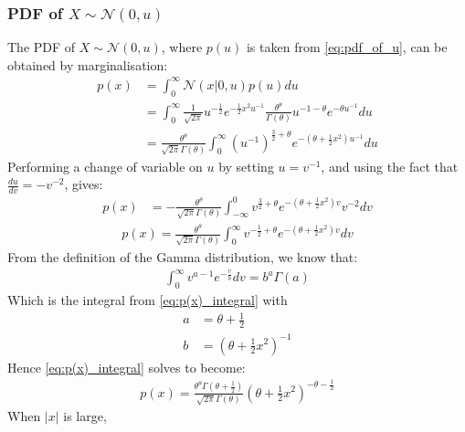 \documentclass[a4paper]{article}
\begin{document}
\subsubsection{PDF of $X \sim \mathcal{N}(0, u)$}
The PDF of $X \sim \mathcal{N}(0, u)$, where $p(u)$ is taken from \autoref{eq:pdf_of_u}, can be obtained by
marginalisation:
\begin{align*}
    p(x) &= \int_0^\infty \mathcal{N}(x | 0, u) p(u) du \\
    &= \int_0^\infty \frac{1}{\sqrt{2\pi}} u^{-\frac{1}{2}} e^{-\frac{1}{2} x^2 u^{-1}}
    \frac{\theta^{\theta}}{\Gamma(\theta)} u^{-1-\theta} e^{-\theta u^{-1}} du \\
    &= \frac{\theta^{\theta}}{\sqrt{2\pi} \Gamma(\theta)}
    \int_0^\infty \left( u^{-1} \right) ^ {\frac{3}{2} + \theta} e^{-\left( \theta + \frac{1}{2} x^2 \right) u^{-1}} du
\end{align*}
Performing a change of variable on $u$ by setting $u = v^{-1}$, and using the fact that $\frac{du}{dv} = -v^{-2}$,
gives:
\begin{align*}
    p(x) &= - \frac{\theta^{\theta}}{\sqrt{2\pi} \Gamma(\theta)}
    \int_{-\infty}^0 v ^ {\frac{3}{2} + \theta} e^{-\left( \theta + \frac{1}{2} x^2 \right) v} v^{-2} dv
\end{align*}
\begin{align}\label{eq:p(x)_integral}
    p(x) = \frac{\theta^{\theta}}{\sqrt{2\pi} \Gamma(\theta)}
    \int_0^\infty v ^ {-\frac{1}{2} + \theta} e^{-\left( \theta + \frac{1}{2} x^2 \right) v} dv
\end{align}
From the definition of the Gamma distribution, we know that:
\begin{align*}
    \int_0^\infty v ^ {a - 1} e^{-\frac{v}{b}} dv = b^a \Gamma(a)
\end{align*}
Which is the integral from \autoref{eq:p(x)_integral} with
\begin{align*}
    a &= \theta + \frac{1}{2} \\
    b &= \left(\theta + \frac{1}{2} x^2 \right) ^ {-1}
\end{align*}
Hence \autoref{eq:p(x)_integral} solves to become:
\begin{align}
    p(x) = \frac{\theta^{\theta} \Gamma\left(\theta + \frac{1}{2} \right)}{\sqrt{2\pi} \Gamma(\theta)}
    \left( \theta + \frac{1}{2}x^2 \right)^{-\theta - \frac{1}{2}}
\end{align}
When $|x|$ is large,


\newpage
%
\end{document}
